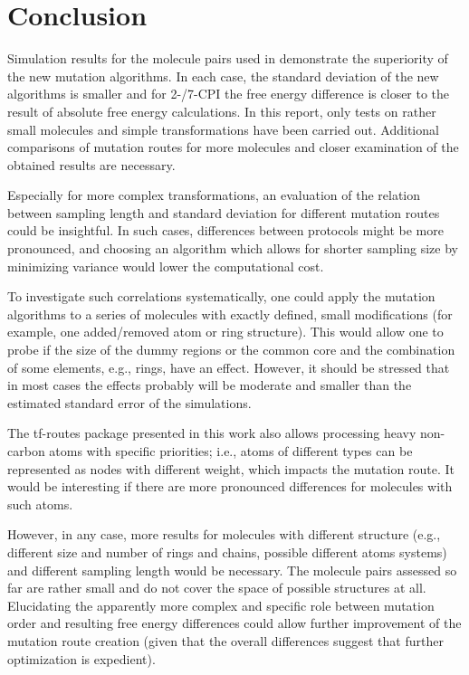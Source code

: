 \chapter{Conclusion}


Simulation results for the molecule pairs used in \cite{Loeffler.2018, Wieder.2022} demonstrate the superiority of the new mutation algorithms. In each case, the standard deviation of the new algorithms is smaller and for 2-/7-CPI the free energy difference is closer to the result of absolute free energy calculations. 
In this report, only tests on rather small molecules and simple transformations have been carried out. Additional comparisons of mutation routes for more molecules and closer examination of the obtained results are necessary.

Especially for more complex transformations, an evaluation of the relation between sampling length and standard deviation for different mutation routes could be insightful. 
In such cases, differences between protocols might be more pronounced, and choosing an algorithm which allows for shorter sampling size by minimizing variance would lower the computational cost.

To investigate such correlations systematically, one could apply the mutation algorithms to a series of molecules with exactly defined, small modifications (for example, one added/removed atom or ring structure). This would allow one to probe if the size of the dummy regions or the common core and the combination of some elements, e.g., rings, have an effect. However, it should be stressed that in most cases the effects probably will be moderate and smaller than the estimated standard error of the simulations.


The tf-routes package presented in this work also allows processing heavy non-carbon atoms with specific priorities; i.e., atoms of different types can be represented as nodes with different weight, which impacts the mutation route. It would be interesting if there are more pronounced differences for molecules with such atoms.

However, in any case, more results for molecules with different structure (e.g., different size and number of rings and chains, possible different atoms systems) and different sampling length would be necessary. The molecule pairs assessed so far are rather small and do not cover the space of possible structures at all.
Elucidating the apparently more complex and specific role between mutation order and resulting free energy differences could allow further improvement of the mutation route creation (given that the overall differences suggest that further optimization is expedient).

